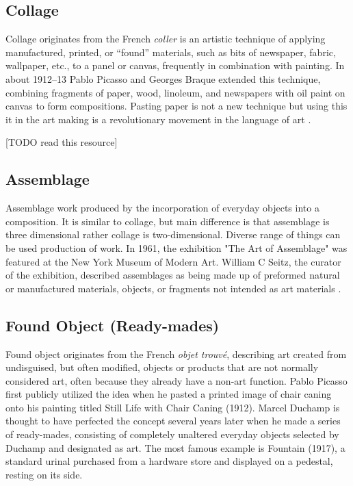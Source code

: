 \subsection{Collage}
Collage originates from the French \textit{coller} is an artistic technique of applying manufactured, printed, or “found” materials, such as bits of newspaper, fabric, wallpaper, etc., to a panel or canvas, frequently in combination with painting. In about 1912–13 Pablo Picasso and Georges Braque extended this technique, combining fragments of paper, wood, linoleum, and newspapers with oil paint on canvas to form compositions. Pasting paper is not a new technique but using this it in the art making is a revolutionary movement in the  language of art \cite{waldman1992collage}.

[TODO read this resource]\cite{greenberg1984collage}

\subsection{Assemblage}
Assemblage work produced by the incorporation of everyday objects into a composition. It is similar to collage, but main difference is that assemblage is three dimensional rather collage is two-dimensional. Diverse range of things can be used production of work. In 1961, the exhibition "The Art of Assemblage" was featured at the New York Museum of Modern Art. William C Seitz, the curator of the exhibition, described assemblages as being made up of preformed natural or manufactured materials, objects, or fragments not intended as art materials \cite{seitz1961art}.

\subsection{Found Object (Ready-mades)}
Found object originates from the French \textit{objet trouvé}, describing art created from undisguised, but often modified, objects or products that are not normally considered art, often because they already have a non-art function. Pablo Picasso first publicly utilized the idea when he pasted a printed image of chair caning onto his painting titled Still Life with Chair Caning (1912). Marcel Duchamp is thought to have perfected the concept several years later when he made a series of ready-mades, consisting of completely unaltered everyday objects selected by Duchamp and designated as art. The most famous example is Fountain (1917), a standard urinal purchased from a hardware store and displayed on a pedestal, resting on its side.


